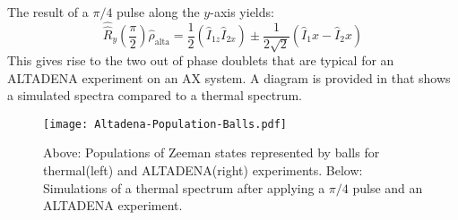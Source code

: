 The result of a $\pi/4$ pulse along the $y$-axis yields:
\begin{equation}
  \hat{\hat{R}}_y(\frac{\pi}{2})\hat{\rho}_{\text{alta}} = \frac{1}{2}(\hat{I}_{1z}\hat{I}_{2x})±\frac{1}{2\sqrt{2}}(\hat{I}_1x-\hat{I}_2x)
\end{equation}
This gives rise to the two out of phase doublets that are typical for an ALTADENA experiment on an AX system. A diagram
is provided in  that shows a simulated spectra compared to a thermal spectrum.

\begin{figure}
  \begin{center}
  \texttt{[image: Altadena-Population-Balls.pdf]}
  \end{center}
  \caption{Above: Populations of Zeeman states represented by balls for thermal(left) and ALTADENA(right) experiments.
  Below: Simulations of a thermal spectrum after applying a $\pi/4$ pulse and an ALTADENA experiment.}
  \label{fig:ALTADENA}
\end{figure}
